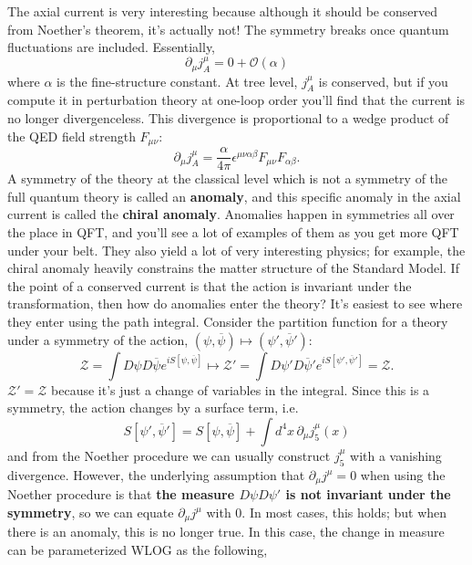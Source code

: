 \documentclass[12pt, oneside]{article}   	%
\theoremstyle{definition}
\begin{document}
\begin{itemize}
\begin{answerbox}
	\raggedright
	The axial current is very interesting because although it should be conserved from Noether's theorem, it's actually not! The symmetry breaks once quantum fluctuations are included. Essentially, 
	\begin{equation}
		\partial_\mu j_A^\mu = 0 + \mathcal O(\alpha)
	\end{equation}
	where $\alpha$ is the fine-structure constant. At tree level, $j_A^\mu$ is conserved, but if you compute it in perturbation theory at one-loop order you'll find that the current is no longer divergenceless. This divergence is proportional to a wedge product of the QED field strength $F_{\mu\nu}$:
	\begin{equation}
		\partial_\mu j_A^\mu = \frac{\alpha}{4\pi} \epsilon^{\mu\nu\alpha\beta} F_{\mu\nu} F_{\alpha\beta}.
	\end{equation}
	A symmetry of the theory at the classical level which is not a symmetry of the full quantum theory is called an \textbf{anomaly}, and this specific anomaly in the axial current is called the \textbf{chiral anomaly}. Anomalies happen in symmetries all over the place in QFT, and you'll see a lot of examples of them as you get more QFT under your belt. They also yield a lot of very interesting physics; for example, the chiral anomaly heavily constrains the matter structure of the Standard Model.
	\newline\newline
	If the point of a conserved current is that the action is invariant under the transformation, then how do anomalies enter the theory? It's easiest to see where they enter using the path integral. Consider the partition function for a theory under a symmetry of the action, $(\psi, \overline\psi)\mapsto (\psi', \overline\psi')$:
	\begin{equation}
		\mathcal Z = \int D\psi D\overline\psi e^{iS[\psi, \overline\psi]} \mapsto \mathcal Z' = \int D\psi' D\overline\psi' e^{iS[\psi', \overline\psi']} = \mathcal Z.
	\end{equation}
	$\mathcal Z' = \mathcal Z$ because it's just a change of variables in the integral. Since this is a symmetry, the action changes by a surface term, i.e. 
	\begin{equation}
		S[\psi', \overline\psi'] = S[\psi, \overline\psi] + \int d^4 x\, \partial_\mu j^{\mu}_5(x)
	\end{equation}
	and from the Noether procedure we can usually construct $j_5^\mu$ with a vanishing divergence. However, the underlying assumption that $\partial_\mu j^\mu = 0$ when using the Noether procedure is that \textbf{the measure $D\psi D\psi'$ is not invariant under the symmetry}, so we can equate $\partial_\mu j^\mu$ with 0. In most cases, this holds; but when there is an anomaly, this is no longer true. In this case, the change in measure can be parameterized WLOG as the following, 

\end{answerbox}
\end{itemize}
\end{document}
